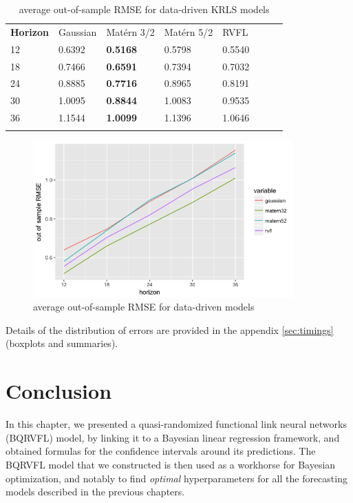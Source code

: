 \begin{table}[!htb]
\begin{center}
\caption{average out-of-sample RMSE for data-driven KRLS models}
\label{tab:min_value_no_ns}       %
\begin{tabular}{llllllll}
\hline\noalign{\smallskip}
\textbf{Horizon} & Gaussian & Mat\'ern 3/2  & Mat\'ern 5/2 & RVFL  \\
\noalign{\smallskip}\hline\noalign{\smallskip}
 12 & 0.6392 & \textbf{0.5168} & 0.5798 & 0.5540 \\
 18 & 0.7466 & \textbf{0.6591} & 0.7394 & 0.7032 \\
 24 & 0.8885 & \textbf{0.7716} & 0.8965 & 0.8191  \\
 30 & 1.0095 & \textbf{0.8844} & 1.0083 & 0.9535  \\
 36 & 1.1544 & \textbf{1.0099} & 1.1396 & 1.0646 \\
 \noalign{\smallskip}\hline
\end{tabular}
\end{center}
\end{table}

\newpage

\begin{figure}[!htb]
\centering
\includegraphics[width=10cm]{gfx/chapter-bayesianrvfl/oos_krls.png}
\caption{average out-of-sample RMSE for data-driven models}
\label{oos_krls}
\end{figure}

Details of the distribution of errors are provided in the appendix \ref{sec:timings} (boxplots and summaries). 

\section{Conclusion}

In this chapter, we presented a quasi-randomized functional link neural networks (BQRVFL) model, by linking it to a Bayesian linear regression framework, and obtained formulas for the confidence intervals around its predictions. The BQRVFL model that we constructed is then used as a workhorse for Bayesian optimization, and notably to find \textit{optimal} hyperparameters for all the forecasting models described in the previous chapters.

